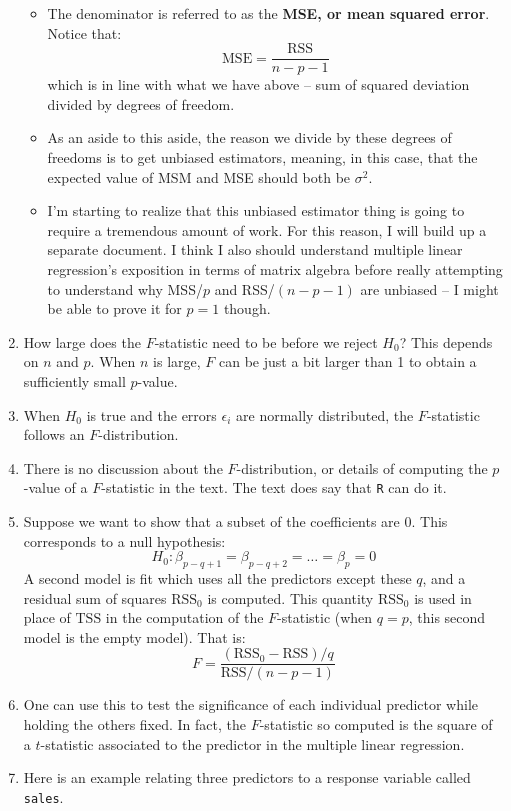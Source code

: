 \documentclass[10pt]{article}
\newcommand{\eps}{\epsilon}
\begin{document}
\begin{enumerate}
{\begin{itemize}
			\item The denominator is referred to as the \textbf{MSE, or mean squared error}.  Notice that: 
			$$\text{MSE} = \dfrac{\text{RSS}}{n - p - 1}$$
			which is in line with what we have above -- sum of squared deviation divided by degrees of freedom.
			
			\item As an aside to this aside, the reason we divide by these degrees of freedoms is to get unbiased estimators, meaning, in this case, that the expected value of MSM and MSE should both be $\sigma^2$.
			
			\item I'm starting to realize that this unbiased estimator thing is going to require a tremendous amount of work.  For this reason, I will build up a separate document.  I think I also should understand multiple linear regression's exposition in terms of matrix algebra before really attempting to understand why MSS/$p$ and RSS/$(n - p - 1)$ are unbiased -- I might be able to prove it for $p = 1$ though.
		\end{itemize}
	}
	\item How large does the $F$-statistic need to be before we reject $H_0$?  This depends on $n$ and $p$.  When $n$ is large, $F$ can be just a bit larger than 1 to obtain a sufficiently small $p$-value.  
	\item When $H_0$ is true and the errors $\eps_i$ are normally distributed, the $F$-statistic follows an $F$-distribution.
	\item {\color{brown} There is no discussion about the $F$-distribution, or details of computing the $p$-value of a $F$-statistic in the text. The text does say that {\tt R} can do it.}
	\item Suppose we want to show that a subset of the coefficients are 0.  This corresponds to a null hypothesis:
	$$H_0 : \beta_{p - q + 1} = \beta_{p - q + 2} = \dots = \beta_p = 0$$
	A second model is fit which uses all the predictors except these $q$, and a residual sum of squares $\text{RSS}_0$ is computed.  This quantity $\text{RSS}_0$ is used in place of $\text{TSS}$ in the computation of the $F$-statistic (when $q = p$, this second model is the empty model).  That is:
	$$F = \dfrac{(\text{RSS}_0 - \text{RSS})/q}{\text{RSS}/(n - p - 1)}$$
	\item One can use this to test the significance of each individual predictor while holding the others fixed.  In fact, the $F$-statistic so computed is the square of a $t$-statistic associated to the predictor in the multiple linear regression.
	\item Here is an example relating three predictors to a response variable called {\tt sales}.
	 

\end{enumerate}
\end{document}

